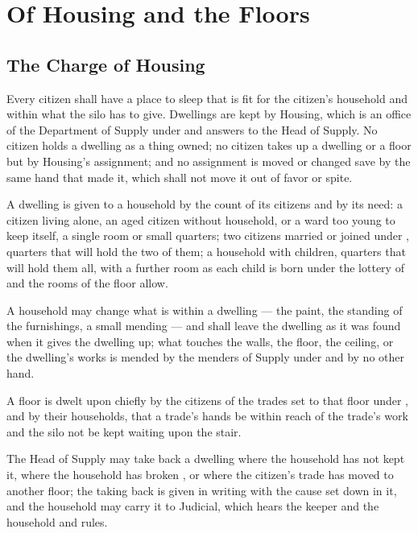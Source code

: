 \chapter{Of Housing and the Floors}
\label{art:housing}


\section{The Charge of Housing}
\label{sec:housing:charge-of-housing}

Every citizen shall have a place to sleep that is fit for the citizen's household and within what the silo has to give. Dwellings are kept by Housing, which is an office of the Department of Supply under  and answers to the Head of Supply. No citizen holds a dwelling as a thing owned; no citizen takes up a dwelling or a floor but by Housing's assignment; and no assignment is moved or changed save by the same hand that made it, which shall not move it out of favor or spite.

\begin{clauses}
\item A dwelling is given to a household by the count of its citizens and by its need: a citizen living alone, an aged citizen without household, or a ward too young to keep itself, a single room or small quarters; two citizens married or joined under , quarters that will hold the two of them; a household with children, quarters that will hold them all, with a further room as each child is born under the lottery of  and the rooms of the floor allow.
\item A household may change what is within a dwelling --- the paint, the standing of the furnishings, a small mending --- and shall leave the dwelling as it was found when it gives the dwelling up; what touches the walls, the floor, the ceiling, or the dwelling's works is mended by the menders of Supply under  and by no other hand.
\item A floor is dwelt upon chiefly by the citizens of the trades set to that floor under , and by their households, that a trade's hands be within reach of the trade's work and the silo not be kept waiting upon the stair.
\item The Head of Supply may take back a dwelling where the household has not kept it, where the household has broken , or where the citizen's trade has moved to another floor; the taking back is given in writing with the cause set down in it, and the household may carry it to Judicial, which hears the keeper and the household and rules.
\end{clauses}

